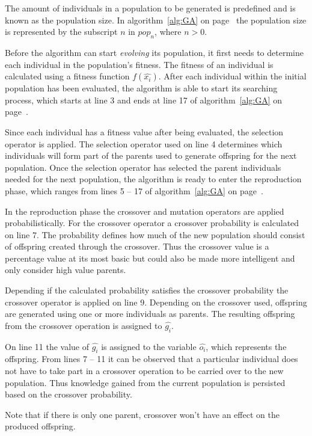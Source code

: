 The amount of individuals in a population to be generated is predefined and is known as the population size. In algorithm~\ref{alg:GA} on page~\pageref{alg:GA} the population size is represented by the subscript $n$ in $pop_n$, where $n > 0$.

Before the algorithm can start \emph{evolving} its population, it first needs to determine each individual in the population's fitness. The fitness of an individual is calculated using a fitness function $f(\hat{x_i})$. After each individual within the initial population has been evaluated, the algorithm is able to start its searching process, which starts at line 3 and ends at line 17 of algorithm~\ref{alg:GA} on page~\pageref{alg:GA}.

Since each individual has a fitness value after being evaluated, the selection operator is applied. The selection operator used on line 4 determines which individuals will form part of the parents used to generate offspring for the next population. Once the selection operator has selected the parent individuals needed for the next population, the algorithm is ready to enter the reproduction phase, which ranges from lines 5 -- 17 of algorithm~\ref{alg:GA} on page~\pageref{alg:GA}.

In the reproduction phase the crossover and mutation operators are applied probabilistically. For the crossover operator a crossover probability is calculated on line 7. The probability defines how much of the new population should consist of offspring created through the crossover. Thus the crossover value is a percentage value at its most basic but could also be made more intelligent and only consider high value parents. 

Depending if the calculated probability satisfies the crossover probability the crossover operator is applied on line 9. Depending on the crossover used, offspring are generated using one or more individuals as parents. The resulting offspring from the crossover operation is assigned to $\hat{g_i}$.

On line 11 the value of $\hat{g_i}$ is assigned to the variable $\hat{o_i}$, which represents the offspring. From lines 7 -- 11 it can be observed that a particular individual does not have to take part in a crossover operation to be carried over to the new population. Thus knowledge gained from the current population is persisted based on the crossover probability.

Note that if there is only one parent, crossover won't have an effect on the produced offspring\cite{CompuIntelligenceIntro}.

